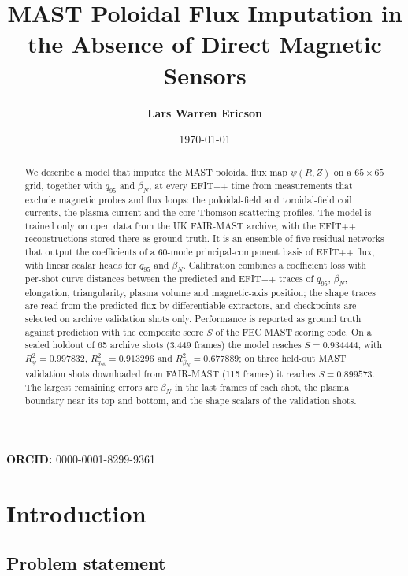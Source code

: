 \documentclass[11pt,a4paper]{article}
\title{\textbf{MAST Poloidal Flux Imputation in the Absence of Direct Magnetic Sensors}}
\author[1]{\textbf{Lars Warren Ericson}}
\affil[1]{Catskills Research Company}
\affil[1]{\url{https://github.com/catskillsresearch/mast-flux-imputation}}
\affil[1]{\texttt{lars.ericson@catskillsresearch.com}}
\date{\today}
\numberwithin{equation}{section}
\begin{document}
\maketitle
\begin{center}\small\textbf{ORCID:} 0000-0001-8299-9361\end{center}
\begin{abstract}
We describe a model that imputes the MAST poloidal flux map \(\psi(R,Z)\) on a \(65\times65\) grid, together with \(q_{95}\) and \(\beta_N\), at every EFIT++ time from measurements that exclude magnetic probes and flux loops: the poloidal-field and toroidal-field coil currents, the plasma current and the core Thomson-scattering profiles. The model is trained only on open data from the UK FAIR-MAST archive, with the EFIT++ reconstructions stored there as ground truth. It is an ensemble of five residual networks that output the coefficients of a 60-mode principal-component basis of EFIT++ flux, with linear scalar heads for \(q_{95}\) and \(\beta_N\). Calibration combines a coefficient loss with per-shot curve distances between the predicted and EFIT++ traces of \(q_{95}\), \(\beta_N\), elongation, triangularity, plasma volume and magnetic-axis position; the shape traces are read from the predicted flux by differentiable extractors, and checkpoints are selected on archive validation shots only. Performance is reported as ground truth against prediction with the composite score \(S\) of the FEC MAST scoring code. On a sealed holdout of 65 archive shots (3,449 frames) the model reaches \(S=0.934444\), with \(R^2_\psi=0.997832\), \(R^2_{q_{95}}=0.913296\) and \(R^2_{\beta_N}=0.677889\); on three held-out MAST validation shots downloaded from FAIR-MAST (115 frames) it reaches \(S=0.899573\). The largest remaining errors are \(\beta_N\) in the last frames of each shot, the plasma boundary near its top and bottom, and the shape scalars of the validation shots.
\end{abstract}
\clearpage
\tableofcontents
\clearpage

\hypertarget{introduction}{%
\clearpage
\section{Introduction}\label{introduction}}

\hypertarget{problem-statement}{%
\subsection{Problem statement}\label{problem-statement}}
\end{document}
